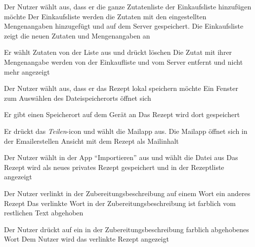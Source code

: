 
{Der Nutzer wählt aus, dass er die ganze Zutatenliste der Einkaufsliste hinzufügen möchte}
{Der Einkaufsliste werden die Zutaten mit den eingestellten Mengenangaben hinzugefügt und auf dem Server gespeichert. Die Einkaufsliste zeigt die neuen Zutaten und Mengenangaben an}

{Er wählt Zutaten von der Liste aus und drückt löschen}
{Die Zutat mit ihrer Mengenangabe werden von der Einkaufliste und vom Server entfernt und nicht mehr angezeigt}


{Der Nutzer wählt aus, dass er das Rezept \gls{lokal} speichern möchte}
{Ein Fenster zum Auswählen des Dateispeicherorts öffnet sich}

{Er gibt einen Speicherort auf dem Gerät an}
{Das Rezept wird dort gespeichert}

{Er drückt das {\em Teilen}-icon und wählt die Mailapp aus.}
{Die Mailapp öffnet sich in der Emailerstellen Ansicht mit dem Rezept als Mailinhalt}


{Der Nutzer wählt in der App "`Importieren"' aus und wählt die Datei aus}
{Das Rezept wird als neues privates Rezept gespeichert und in der \gls{Rezeptliste} angezeigt}


{Der Nutzer verlinkt in der Zubereitungsbeschreibung auf einem Wort ein anderes Rezept}
{Das verlinkte Wort in der Zubereitungsbeschreibung ist farblich vom restlichen Text abgehoben}

{Der Nutzer drückt auf ein in der Zubereitungsbeschreibung farblich abgehobenes Wort}
{Dem Nutzer wird das verlinkte Rezept angezeigt}


